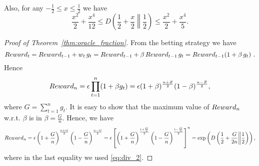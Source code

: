 Also, for any $-\frac{1}{2} \leq x\leq \frac{1}{2}$ we have
\[
\frac{x^2}{2} +\frac{x^4}{12}\leq D\left(\frac{1}{2}+\frac{x}{2}\middle\|\frac{1}{2}\right) \leq \frac{x^2}{2} + \frac{x^4}{5}.
\]

\begin{proof}[Proof of Theorem~\ref{thm:oracle_fraction}]
From the betting strategy we have
\[
Reward_t=Reward_{t-1} + w_t \, g_t = Reward_{t-1} + \beta \, Reward_{t-1} \, g_t = Reward_{t-1} (1+\beta \, g_t)~.
\]
Hence
\[
Reward_n=\epsilon \prod_{t=1}^n (1+\beta g_t) = \epsilon (1+\beta)^\frac{n+Z}{2} (1-\beta)^\frac{n-Z}{2},
\]
where $G=\sum_{t=1}^n g_t$.
It is easy to show that the maximum value of $Reward_n$ w.r.t. $\beta$ is in $\beta=\frac{G}{n}$. 
Hence, we have
\[
Reward_n = \epsilon \left(1+\frac{G}{n}\right)^\frac{n+G}{2} \left(1-\frac{G}{n}\right)^\frac{n-G}{2} 
= \epsilon \left[\left(1+\frac{G}{n}\right)^\frac{1+\frac{G}{n}}{2} \left(1-\frac{G}{n}\right)^\frac{1-\frac{G}{n}}{2}\right]^n = \exp\left( D\left(\frac{1}{2}+\frac{G}{2n}\middle\|\frac{1}{2}\right) \right),
\]
where in the last equality we used \eqref{eq:div_2}.
\end{proof}

